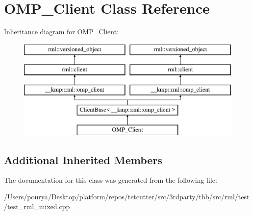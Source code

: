 \hypertarget{classOMP__Client}{}\section{O\+M\+P\+\_\+\+Client Class Reference}
\label{classOMP__Client}
Inheritance diagram for O\+M\+P\+\_\+\+Client\+:\begin{figure}[H]
\begin{center}
\leavevmode
\includegraphics[height=5.000000cm]{classOMP__Client}
\end{center}
\end{figure}
\subsection*{Additional Inherited Members}


The documentation for this class was generated from the following file\+:\begin{DoxyCompactItemize}
\item 
/\+Users/pourya/\+Desktop/platform/repos/tetcutter/src/3rdparty/tbb/src/rml/test/test\+\_\+rml\+\_\+mixed.\+cpp\end{DoxyCompactItemize}
